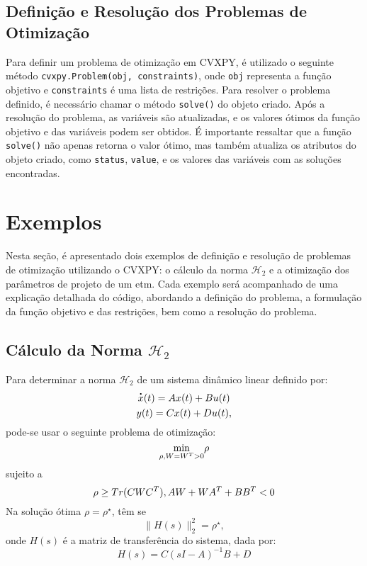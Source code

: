 \subsection{Definição e Resolução dos Problemas de Otimização}

Para definir um problema de otimização em CVXPY, é utilizado o seguinte método \texttt{cvxpy.Problem(obj, constraints)}, onde \texttt{obj} representa a função objetivo e \texttt{constraints} é uma lista de restrições. Para resolver o problema definido, é necessário chamar o método \texttt{solve()} do objeto criado. Após a resolução do problema, as variáveis são atualizadas, e os valores ótimos da função objetivo e das variáveis podem ser obtidos. É importante ressaltar que a função \texttt{solve()} não apenas retorna o valor ótimo, mas também atualiza os atributos do objeto criado, como \texttt{status}, \texttt{value}, e os valores das variáveis com as soluções encontradas.

\section{Exemplos}

Nesta seção, é apresentado dois exemplos de definição e resolução de problemas de otimização utilizando o CVXPY: o cálculo da norma $\mathcal{H}_{2}$ e a otimização dos parâmetros de projeto de um \acrshort{etm}. Cada exemplo será acompanhado de uma explicação detalhada do código, abordando a definição do problema, a formulação da função objetivo e das restrições, bem como a resolução do problema.

\subsection{Cálculo da Norma $\mathcal{H}_{2}$}

Para determinar a norma $\mathscr{H} _2$ de um sistema dinâmico linear definido por: \begin{gather} \dt{x}(t) = Ax(t) + Bu(t) \\ y(t) = Cx(t) + Du(t), \end{gather} pode-se usar o seguinte problema de otimização: \begin{equation} \underset{\rho, \space W = W^T > 0}{\min} \space\space \rho \end{equation} sujeito a \begin{equation}
\rho \geq Tr(CWC^T), \space
AW + WA^T + BB^T < 0
\end{equation} Na solução ótima $\rho = \rho^\star$, têm se \begin{equation} \lVert H(s) \rVert ^ 2 _ 2 = \rho^\star, \end{equation} onde $H(s)$ é a matriz de transferência do sistema, dada por: \begin{equation} H(s) = C(sI- A)^{-1}B +D  \end{equation}

